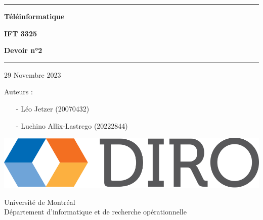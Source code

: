 \documentclass{article}
\begin{document}
\begin{titlepage}

	\begin{center}
		\hrule

		\vspace{.5cm}

		\Huge
		\textbf{Téléinformatique}

		\vspace{.3cm}
		\LARGE

		\textbf{IFT 3325}
		\vspace{.3cm}

		\textbf{Devoir n°2}
		\vspace{.3cm}

		\hrule

		\vspace{1cm}

		29 Novembre 2023 \\
	\end{center}

	\vspace{2cm}

	\LARGE

	\noindent Auteurs :

	\begin{enumerate}
		\item[-] Léo Jetzer (20070432)
		\item[-] Luchino Allix-Lastrego (20222844)   
	\end{enumerate}


			
	\vfill


	\begin{center}

		\includegraphics[scale=.1]{diro.png}

		\vspace{0.8cm}

		Université de Montréal\\
		Département d'informatique et de recherche opérationnelle\\

	\end{center}
	
\end{titlepage}
\end{document}
